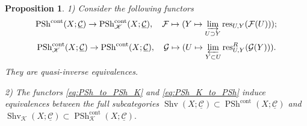 \documentclass[11pt,leqno]{amsart}
\newtheorem{prop}[theo]{Proposition}
\numberwithin{equation}{section}
\newcommand{\ms}[1]{\mathscr{#1}}
\newcommand{\msK}{\ms{K}}
\newcommand{\limproj}{\varprojlim}
\newcommand{\liminj}{\varinjlim}
\newcommand{\cont}{\operatorname{cont}}
\newcommand{\cF}{{\mathcal F}}
\newcommand{\cG}{{\mathcal G}}
\newcommand{\cC}{{\mathcal C}}
\newcommand{\un}{\underline}
\newcommand{\PSh}{\operatorname{PSh}}
\newcommand{\Sh}{\operatorname{Shv}}
\newcommand{\res}{\operatorname{res}}
\begin{document}
\begin{prop}\label{prop:PSh_and_PSh_K}\cite[Theorem 7.3.4.9, Corollary 7.3.4.10]{Lur09} 1) Consider the following functors
\begin{equation}\label{eq:PSh_to_PSh_K} \PSh^{\cont}(X;\un{\cC})\to \PSh^{\cont}_{\msK}(X;\un{\cC}),\quad \cF\mapsto (Y\mapsto \liminj\limits_{U\supset Y}\res_{U,Y}(\cF(U)));\end{equation}
\begin{equation}\label{eq:PSh_K_to_PSh} \PSh^{\cont}_{\msK}(X;\un{\cC})\to \PSh^{\cont}(X;\un{\cC}),\quad \cG\mapsto (U\mapsto \limproj\limits_{Y\subset U}\res_{U,Y}^R(\cG(Y))).\end{equation}
They are quasi-inverse equivalences.

2) The functors \eqref{eq:PSh_to_PSh_K} and \eqref{eq:PSh_K_to_PSh} induce equivalences between the full subcategories $\Sh(X;\un{\cC})\subset \PSh^{\cont}(X;\un{\cC})$ and $\Sh_{\msK}(X;\un{\cC})\subset \PSh^{\cont}_{\msK}(X;\un{\cC}).$
\end{prop}
\end{document}
